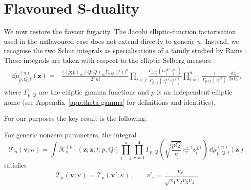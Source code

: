 \section{Flavoured S-duality}
\label{sec:rains}\label{sec:flavoured}
We now restore the flavour fugacity. The Jacobi elliptic-function
factorisation used in the unflavoured case does not extend directly to
generic $u$. Instead, we recognise the two Schur integrals as
specialisations of a family studied by Rains~\cite{Rains:2018kernel}.
These integrals are taken with respect to the elliptic Selberg measure
\begin{equation}
  \begin{aligned}
    \dd\mu_{p,Q,t}^{(n)}(\mathbf{z})
    ={}&\frac{\bigl((p;p)_\infty(Q;Q)_\infty\Gamma_{p,Q}(t)\bigr)^n}
    {2^n n!}
    \prod_{i<j}
    \frac{\Gamma_{p,Q}(t z_i^{\pm1}z_j^{\pm1})}
    {\Gamma_{p,Q}(z_i^{\pm1}z_j^{\pm1})}\prod_{i=1}^n
    \frac{1}{\Gamma_{p,Q}(z_i^{\pm2})}\,
    \frac{\dd z_i}{2\pi\ii z_i},
  \end{aligned}
  \label{rains:measure}
\end{equation}
where $\Gamma_{p,Q}$ are the elliptic gamma functions and $p$ is an independent
elliptic nome (see Appendix~\ref{app:theta-gamma} for definitions and
identities).

For our purposes the key result is the following.

\begin{theorem}
  \label{thm:rains}
  For generic nonzero parameters, the integral
  \begin{equation}
    \mathcal T_n(\mathbf{v};\kappa)=\int
    \mathcal K_\kappa^{(n)}(\mathbf{z};\mathbf{z};t;p,Q)
    \prod_{i=1}^n\prod_{r=1}^4
    \Gamma_{p,Q}\!\left(\sqrt{\frac{pQ}{\kappa}}\,
    v_r^{\pm1}z_i^{\pm1}\right)
    \,\dd\mu_{p,Q,t}^{(n)}(\mathbf{z})
    \label{rains:trace}
  \end{equation}
  satisfies
  \begin{equation}
    \mathcal T_n(\mathbf{v};\kappa)=\mathcal T_n(\mathbf{v}';\kappa),\qquad
    v'_r=\frac{v_r}{\sqrt{v_1v_2v_3v_4}}.
    \label{rains:general-reflection}
  \end{equation}
\end{theorem}

